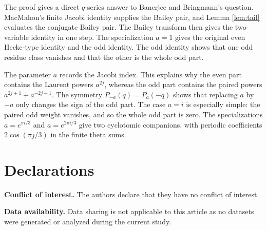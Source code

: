 \documentclass[11pt]{amsart}
\theoremstyle{remark}
\begin{document}
The proof gives a direct $q$-series answer to Banerjee and Bringmann's question.  MacMahon's finite Jacobi identity supplies the Bailey pair, and Lemma \ref{lem:tail} evaluates the conjugate Bailey pair.  The Bailey transform then gives the two-variable identity in one step.  The specialization $a=1$ gives the original even Hecke-type identity and the odd identity.  The odd identity shows that one odd residue class vanishes and that the other is the whole odd part.

The parameter $a$ records the Jacobi index.  This explains why the even part contains the Laurent powers $a^{2j}$, whereas the odd part contains the paired powers $a^{2j+1}+a^{-2j-1}$.  The symmetry $P_{-a}(q)=P_a(-q)$ shows that replacing $a$ by $-a$ only changes the sign of the odd part.  The case $a=i$ is especially simple: the paired odd weight vanishes, and so the whole odd part is zero.  The specializations $a=e^{\pi i/3}$ and $a=e^{2\pi i/3}$ give two cyclotomic companions, with periodic coefficients $2\cos(\pi j/3)$ in the finite theta sums.


\section*{Declarations}


\noindent\textbf{Conflict of interest.} The authors declare that they have no conflict of interest.

\noindent\textbf{Data availability.} Data sharing is not applicable to this article as no datasets were generated or analyzed during the current study.
\end{document}
